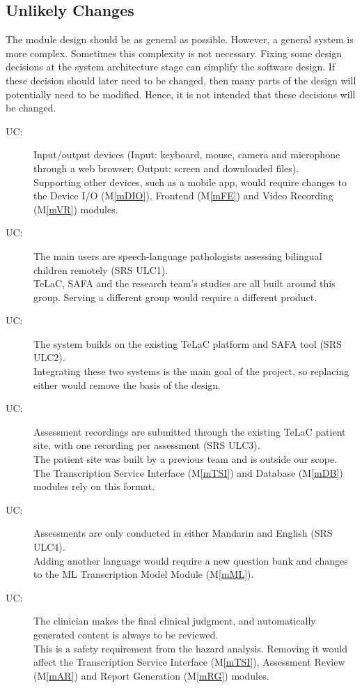 \documentclass[12pt, titlepage]{article}
\newcounter{ucnum}
\newcommand{\uctheucnum}{UC\theucnum}
\newcommand{\mref}[1]{M\ref{#1}}
\begin{document}
\subsection{Unlikely Changes} \label{SecUchange}

The module design should be as general as possible. However, a general system is
more complex. Sometimes this complexity is not necessary. Fixing some design
decisions at the system architecture stage can simplify the software design. If
these decision should later need to be changed, then many parts of the design
will potentially need to be modified. Hence, it is not intended that these
decisions will be changed.

\begin{description}
\item[ \uctheucnum \label{ucIO}:] Input/output devices (Input: keyboard, mouse, camera and microphone through a web browser; Output: screen and downloaded files).\\
Supporting other devices, such as a mobile app, would require changes to the Device I/O (\mref{mDIO}), Frontend (\mref{mFE}) and Video Recording (\mref{mVR}) modules.
\item[ \uctheucnum \label{ucUsers}:] The main users are speech-language pathologists assessing bilingual children remotely (SRS ULC1).\\
TeLaC, SAFA and the research team's studies are all built around this group. Serving a different group would require a different product.
\item[ \uctheucnum \label{ucPlatform}:] The system builds on the existing TeLaC platform and SAFA tool (SRS ULC2).\\
Integrating these two systems is the main goal of the project, so replacing either would remove the basis of the design.
\item[ \uctheucnum \label{ucSource}:] Assessment recordings are submitted through the existing TeLaC patient site, with one recording per assessment (SRS ULC3).\\
The patient site was built by a previous team and is outside our scope. The Transcription Service Interface (\mref{mTSI}) and Database (\mref{mDB}) modules rely on this format.
\item[ \uctheucnum \label{ucLanguages}:] Assessments are only conducted in either Mandarin and English (SRS ULC4).\\
Adding another language would require a new question bank and changes to the ML Transcription Model Module (\mref{mML}).
\item[ \uctheucnum \label{ucJudgment}:] The clinician makes the final clinical judgment, and automatically generated content is always to be reviewed.\\
This is a safety requirement from the hazard analysis. Removing it would affect the Transcription Service Interface (\mref{mTSI}), Assessment Review (\mref{mAR}) and Report Generation (\mref{mRG}) modules.
\end{description}
\end{document}
